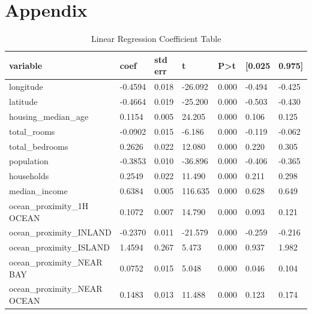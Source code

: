 \documentclass[11pt]{article}
\begin{document}
\appendix
\section{Appendix}
\begin{table}[h]
        \begin{tabular}{|l|l|l|l|l|l|l|} 
        \hline
        \textbf{variable} & \textbf{coef} & \textbf{std err} & \textbf{t} & \textbf{P\textgreater{}\textbar{}t\textbar{}} & \textbf{[0.025} & \textbf{0.975]} \\ 
        \hline
        longitude & -0.4594 & 0.018 & -26.092 & 0.000 & -0.494 & -0.425 \\ 
        \hline
        latitude & -0.4664 & 0.019 & -25.200 & 0.000 & -0.503 & -0.430 \\ 
        \hline
        housing\_median\_age & 0.1154 & 0.005 & 24.205 & 0.000 & 0.106 & 0.125 \\ 
        \hline
        total\_rooms & -0.0902 & 0.015 & -6.186 & 0.000 & -0.119 & -0.062 \\ 
        \hline
        total\_bedrooms & 0.2626 & 0.022 & 12.080 & 0.000 & 0.220 & 0.305 \\ 
        \hline
        population & -0.3853 & 0.010 & -36.896 & 0.000 & -0.406 & -0.365 \\ 
        \hline
        households & 0.2549 & 0.022 & 11.490 & 0.000 & 0.211 & 0.298 \\ 
        \hline
        median\_income & 0.6384 & 0.005 & 116.635 & 0.000 & 0.628 & 0.649 \\ 
        \hline
        ocean\_proximity\_1H OCEAN & 0.1072 & 0.007 & 14.790 & 0.000 & 0.093 & 0.121 \\ 
        \hline
        ocean\_proximity\_INLAND & -0.2370 & 0.011 & -21.579 & 0.000 & -0.259 & -0.216 \\ 
        \hline
        ocean\_proximity\_ISLAND & 1.4594 & 0.267 & 5.473 & 0.000 & 0.937 & 1.982 \\ 
        \hline
        ocean\_proximity\_NEAR BAY & 0.0752 & 0.015 & 5.048 & 0.000 & 0.046 & 0.104 \\ 
        \hline
        ocean\_proximity\_NEAR OCEAN & 0.1483 & 0.013 & 11.488 & 0.000 & 0.123 & 0.174 \\
        \hline
        \end{tabular}
\caption{Linear Regression Coefficient Table}
\label{tab:lin-reg-table}
\end{table}



\end{document}
